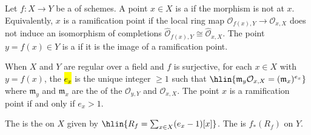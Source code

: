 \begin{definition} \label{definition:ramification_and_branching_for_finite_morphisms_of_schemes}
Let $f : X \to Y$ be a  of schemes. A point $x \in X$ is a  if the morphism is not  at $x$. Equivalently, $x$ is a ramification point if the local ring map $\mathcal{O}_{f(x),Y} \to \mathcal{O}_{x,X}$ does not induce an isomorphism of completions $\widehat{\mathcal{O}}_{f(x),Y} \cong \widehat{\mathcal{O}}_{x,X}$. The point $y = f(x) \in Y$ is a  if it is the image of a ramification point.

When $X$ and $Y$ are regular   over a field and $f$ is surjective, for each $x \in X$ with $y = f(x)$, the  \hl{$e_x$} is the unique integer $\geq 1$ such that
$\hlin{\mathfrak{m}_y \mathcal{O}_{x,X} = (\mathfrak{m}_x)^{e_x}}$
where $\mathfrak{m}_y$ and $\mathfrak{m}_x$ are the  of the  $\mathcal{O}_{y,Y}$ and $\mathcal{O}_{x,X}$. The point $x$ is a ramification point if and only if $e_x > 1$. 

The  is the  on $X$ given by
$\hlin{R_f = \sum_{x \in X} (e_x - 1) [x]}$.
The  is $f_*(R_f)$ on $Y$.
\end{definition}
